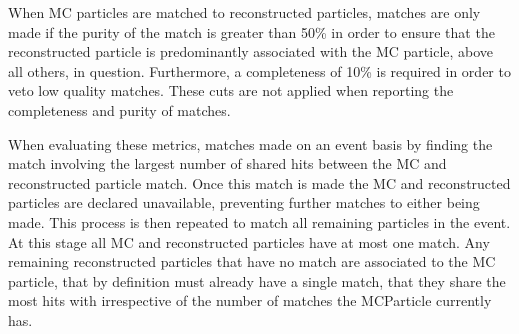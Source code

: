 When MC particles are matched to reconstructed particles, matches are only made if the purity of the match is greater than 50\% in order to ensure that the reconstructed particle is predominantly associated with the MC particle, above all others, in question.  Furthermore, a completeness of 10\% is required in order to veto low quality matches.  These cuts are not applied when reporting the completeness and purity of matches.  

When evaluating these metrics, matches made on an event basis by finding the match involving the largest number of shared hits between the MC and reconstructed particle match.  Once this match is made the MC and reconstructed particles are declared unavailable, preventing further matches to either being made.  This process is then repeated to match all remaining particles in the event.  At this stage all MC and reconstructed particles have at most one match.  Any remaining reconstructed particles that have no match are associated to the MC particle, that by definition must already have a single match, that they share the most hits with irrespective of the number of matches the MCParticle currently has.

